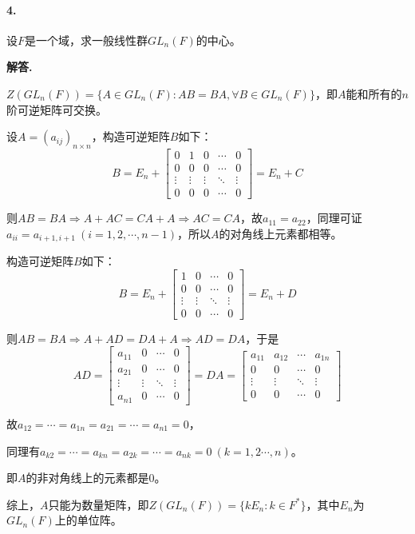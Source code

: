\documentclass[12pt, a4paper, oneside]{ctexart}
\newenvironment{solution}{\par\noindent\textbf{解答. }}{\bigskip\par}
\begin{document}
\paragraph{4.}设$F$是一个域，求一般线性群$GL_n(F)$的中心。
\begin{solution}

    $Z(GL_n(F)) = \{A\in GL_n(F):AB=BA,\forall B\in GL_n(F)\}$，即$A$能和所有的$n$阶可逆矩阵可交换。

    设$A=(a_{ij})_{n\times n}$，构造可逆矩阵$B$如下：
    \begin{equation*}
        B=E_n+\begin{bmatrix}
            0&1&0&\cdots&0\\
            0&0&0&\cdots&0\\
            \vdots&\vdots&\vdots&\ddots&\vdots\\
            0&0&0&\cdots&0
        \end{bmatrix}
         = E_n+C
    \end{equation*}
    
    则$AB=BA\Rightarrow A+AC=CA+A\Rightarrow AC=CA$，故$a_{11} = a_{22}$，同理可证$a_{ii}=a_{i+1,i+1}\ (i=1,2,\cdots,n-1)$，所以$A$的对角线上元素都相等。

    构造可逆矩阵$B$如下：
    \begin{equation*}
        B=E_n+\begin{bmatrix}
            1&0&\cdots&0\\0&0&\cdots&0\\
            \vdots&\vdots&\ddots&\vdots\\0&0&\cdots&0
        \end{bmatrix}
        =E_n+D
    \end{equation*}

    则$AB=BA\Rightarrow A+AD=DA+A\Rightarrow AD=DA$，于是
    \begin{equation*}
        AD=\begin{bmatrix}
            a_{11}&0&\cdots&0\\
            a_{21}&0&\cdots&0\\
            \vdots&\vdots&\ddots&\vdots\\
            a_{n1}&0&\cdots&0
        \end{bmatrix}=DA=\begin{bmatrix}
            a_{11}&a_{12}&\cdots&a_{1n}\\0&0&\cdots&0\\
            \vdots&\vdots&\ddots&\vdots\\0&0&\cdots&0
        \end{bmatrix}
    \end{equation*}

    故$a_{12}=\cdots=a_{1n}=a_{21}=\cdots=a_{n1}=0$，

    同理有$a_{k2}=\cdots=a_{kn}=a_{2k}=\cdots=a_{nk}=0\ (k=1,2\cdots,n)$。

    即$A$的非对角线上的元素都是$0$。

    综上，$A$只能为数量矩阵，即$Z(GL_n(F)) = \{kE_n:k\in F^*\}$，其中$E_n$为$GL_n(F)$上的单位阵。
\end{solution}
\end{document}
